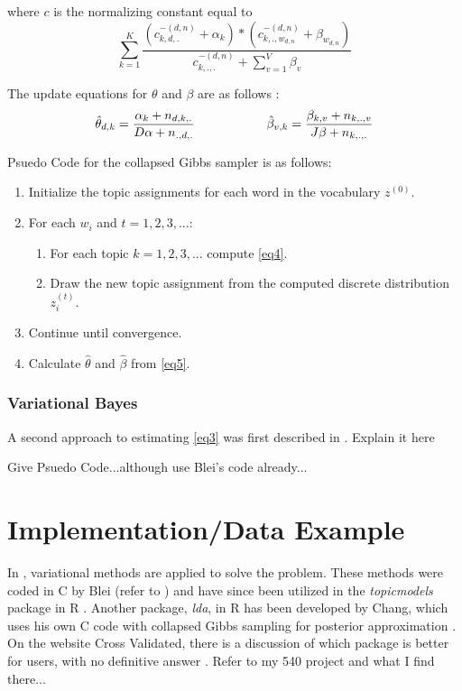 \documentclass[3p,times]{elsarticle}
\begin{document}
\noindent where $c$ is the normalizing constant equal to 
$$
\sum_{k=1}^{K}{\frac{(c^{-(d,n)}_{k,d,.}+\alpha_{k})*(c^{-(d,n)}_{k,.,w_{d,n}}+\beta_{w_{d,n}})}{c^{-(d,n)}_{k,.,.}+\sum_{v=1}^{V}{\beta_{v}}}} 
$$

\noindent The update equations for $\theta$ and $\beta$ are as follows \cite{multinom}: 
\begin{equation} \label{eq5}
\hat{\theta}_{d,k}=\frac{\alpha_{k}+n_{d,k,.}}{D\alpha+n_{.,d,.}} \hspace{20mm} \hat{\beta}_{v,k}=\frac{\beta_{k,v}+n_{k,.,v}}{J\beta+n_{k,.,.}}
\end{equation}

Psuedo Code for the collapsed Gibbs sampler is as follows:
\begin{enumerate}
	\item Initialize the topic assignments for each word in the vocabulary $z^{(0)}$.
	\item For each $w_{i}$ and $t=1,2,3,...$: 
	\begin{enumerate}
		\item For each topic $k=1,2,3,...$ compute \ref{eq4}.
		\item Draw the new topic assignment from the computed discrete distribution $z^{(t)}_{i}$.
	\end{enumerate}
	\item Continue until convergence.
	\item Calculate $\hat{\theta}$ and $\hat{\beta}$ from \ref{eq5}.
\end{enumerate}

\subsubsection{Variational Bayes}
A second approach to estimating \ref{eq3} was first described in \cite{lda}. Explain it here 

Give Psuedo Code...although use Blei's code already...

\section{Implementation/Data Example}
\noindent In \cite{lda}, variational methods are applied to solve the problem. These methods were coded in C by Blei (refer to \cite{Ccode}) and have since been utilized in the \textit{topicmodels} package in R \cite{topicsR}. Another package, \textit{lda}, in R has been developed by Chang, which uses his own C code with collapsed Gibbs sampling for posterior approximation \cite{ldaR}. On the website Cross Validated, there is a discussion of which package is better for users, with no definitive answer \cite{STACK}. Refer to my 540 project and what I find there...
\end{document}
